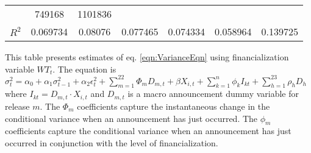 \begin{sidewaystable}
{\begin{tabular}{@{}lllllllllllll@{}}
    & \multicolumn{2}{c}{ 749168 }                                                   & \multicolumn{2}{c}{ 1101836 }                                                 \\ \textbf{$R^2$}             &\multicolumn{2}{c}{ 0.069734 }                                                 & \multicolumn{2}{c}{ 0.08076 }                                                 & \multicolumn{2}{c}{ 0.077465 }                                                 & \multicolumn{2}{c}{ 0.074334 }                                                 & \multicolumn{2}{c}{ 0.058964 }                                                   & \multicolumn{2}{c}{ 0.139725 }                                                 \\ \bottomrule 
\end{tabular}
}
\begin{tablenotes}\item 
        \singlespacing
        \footnotesize
        This table presents estimates of eq. \ref{eqn:VarianceEqn} using financialization variable $WT_t$. The equation is $\sigma_{t}^2=\alpha_0+\alpha_1 \sigma_{t-1}^2+\alpha_2 \epsilon_t^2 +\sum_{m=1}^{22} \Phi_m D_{m,t}+\beta X_{i,t}+\sum_{k=1}^n \phi_k I_{kt} + \sum_{h=1}^{23} \rho_h D_h$ where $I_{kt}=D_{m,t} \cdot X_{i,t}$ and $D_{m,t}$ is a macro announcement dummy variable for release $m$. The $\Phi_m$ coefficients capture the instantaneous change in the conditional variance when an announcement has just occurred. The $\phi_m$ coefficients capture the conditional variance when an announcement has just occurred in conjunction with the level of financialization.
\end{tablenotes}
\end{sidewaystable}

